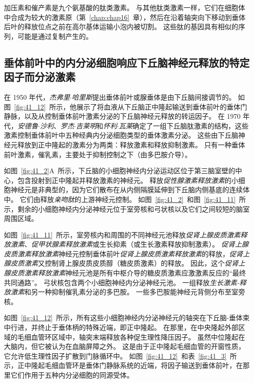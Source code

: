 加压素和催产素是九个氨基酸的肽类激素。
与其他肽类激素一样，它们在细胞体中合成为较大的激素原（第~\ref{chap:chap16}~章），然后在沿着轴突向下移动到垂体后叶的释放位点之前在高尔基体运输小泡内被切割。
这些肽的基因具有相似的序列，可能是通过复制产生的。



\subsection{垂体前叶中的内分泌细胞响应下丘脑神经元释放的特定因子而分泌激素}

在 1950 年代，\textit{杰弗里$\cdot$哈里斯}提出垂体前叶或腺垂体是由下丘脑间接调节的。
如图~\ref{fig:41_12}~所示，他展示了将血液从下丘脑正中隆起输送到垂体前叶的垂体门静脉，以及从控制垂体前叶激素分泌的下丘脑神经元释放的转运因子。
在 1970 年代，\textit{安德鲁$\cdot$沙利}、\textit{罗杰$\cdot$吉莱明}和\textit{怀利$\cdot$瓦莱}确定了一组下丘脑肽激素的结构，这些激素控制垂体前叶中五种经典内分泌细胞类型的垂体激素分泌。
这些由下丘脑神经元释放到正中隆起的激素分为两类：释放激素和释放抑制激素。
只有一种垂体前叶激素，催乳素，主要处于抑制控制之下（由多巴胺介导）。


如图~\ref{fig:41_2}A~所示，下丘脑的小细胞神经内分泌运动区位于第三脑室壁的中心，包含投射到正中隆起并释放激素的神经元。
释放\textit{促性腺激素释放激素}的小细胞神经元是非典型的，因为它们散布在从内侧隔膜延伸到下丘脑内侧基底的连续体中。
它们由释放\textit{亲吻肽}的上游神经元控制。
如图~\ref{fig:41_2}~和图~\ref{fig:41_11}~所示，剩余的小细胞神经内分泌神经元位于室旁核和弓状核以及它们之间较短的脑室周围区域。


如图~\ref{fig:41_11}~所示，室旁核内和周围的不同神经元池释放\textit{促肾上腺皮质激素释放激素}、\textit{促甲状腺素释放激素}或生长抑素（或生长激素释放抑制激素）。
\textit{促肾上腺皮质激素释放激素}神经元控制垂体前叶\textit{促肾上腺皮质激素释放激素}的释放，\textit{促肾上腺皮质激素}又控制肾上腺皮质皮质醇（糖皮质激素）的释放。
因此，这个\textit{促肾上腺皮质激素释放激素}神经元池是所有中枢介导的糖皮质激素应激激素反应的“最终共同通路”。
弓状核包含两个小细胞神经内分泌神经元池。
一组释放\textit{生长激素-释放激素}和另一种抑制催乳素分泌的多巴胺。
一些多巴胺能神经元背侧分布至室旁核。


如图~\ref{fig:41_12}~所示，所有这些小细胞神经内分泌神经元的轴突在下丘脑-垂体束中行进，并终止于垂体柄的特殊近端，即正中隆起。
在那里，在中央隆起外部区域的毛细血管环区域中，轴突末端释放各种促生理性降压因子。
虽然中位隆起在大脑内，但它被认为在血脑屏障之外。
这是由于正中隆起毛细血管的开窗性质，它允许低生理性因子扩散到门脉循环中。
如图~\ref{fig:41_12}~和表~\ref{fig:41_3}~所示，正中隆起毛细血管环是垂体门静脉系统的近端，将因子输送到垂体前叶，在那里它们作用于五种内分泌细胞的同源受体。


